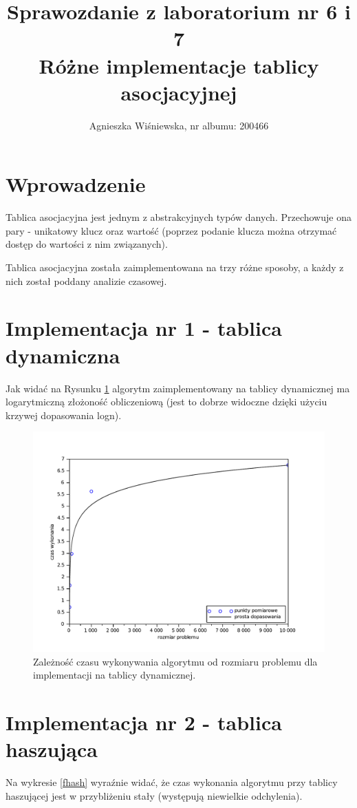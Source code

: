 \documentclass{mwart}
\title{\Huge{Sprawozdanie z laboratorium nr 6 i 7 \\
Różne implementacje tablicy asocjacyjnej }}
\author{Agnieszka Wiśniewska, nr albumu: 200466}
\begin{document}
\maketitle

\section{Wprowadzenie}
Tablica asocjacyjna jest jednym z abstrakcyjnych typów danych. Przechowuje ona pary - unikatowy klucz oraz wartość (poprzez podanie klucza można otrzymać dostęp do wartości z nim związanych).

Tablica asocjacyjna została zaimplementowana na trzy różne sposoby, a każdy z nich został poddany analizie czasowej.

\section{Implementacja nr 1 - tablica dynamiczna}
Jak widać na Rysunku \ref{faarray} algorytm zaimplementowany na tablicy dynamicznej ma logarytmiczną złożoność obliczeniową (jest to dobrze widoczne dzięki użyciu krzywej dopasowania logn). 
\begin{figure}[!htp]
\centering
\includegraphics[width=\textwidth]{aarray.pdf}
\caption{Zależność czasu wykonywania algorytmu od rozmiaru problemu dla implementacji na tablicy dynamicznej. \label{faarray}} 
\end{figure}

\section{Implementacja nr 2 - tablica haszująca}
Na wykresie \ref{fhash} wyraźnie widać, że czas wykonania algorytmu przy tablicy haszującej jest w przybliżeniu stały (występują niewielkie odchylenia).
\end{document}
